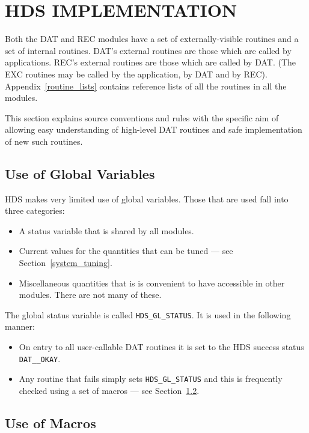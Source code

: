 \section {HDS IMPLEMENTATION}

Both the DAT and REC modules have a set of externally-visible routines and a set
of internal routines. DAT's external routines are those which are called by
applications. REC's external routines are those which are called by DAT. (The
EXC routines may be called by the application, by DAT and by REC).
Appendix~\ref{routine_lists} contains reference lists of all the routines
in all the modules.

This section explains source conventions and rules with the specific aim of
allowing easy understanding of high-level DAT routines and safe implementation
of new such routines.

\subsection {Use of Global Variables}
\label {use_of_global_variables}

HDS makes very limited use of global variables. Those that are used fall
into three categories:

\begin {itemize}
\item A status variable that is shared by all modules.
\item Current values for the quantities that can be tuned --- see
Section~\ref{system_tuning}.
\item Miscellaneous quantities that is is convenient to have accessible
in other modules. There are not many of these.
\end {itemize}

The global status variable is called {\tt HDS\_GL\_STATUS}. It is used in
the following manner:

\begin {itemize}
\item On entry to all user-callable DAT routines it is set to the HDS success
status {\tt DAT\_\_OKAY}.
\item Any routine that fails simply sets {\tt HDS\_GL\_STATUS} and this
is frequently checked using a set of macros --- see
Section~\ref{use_of_macros}.
\end {itemize}

\subsection {Use of Macros}
\label {use_of_macros}

